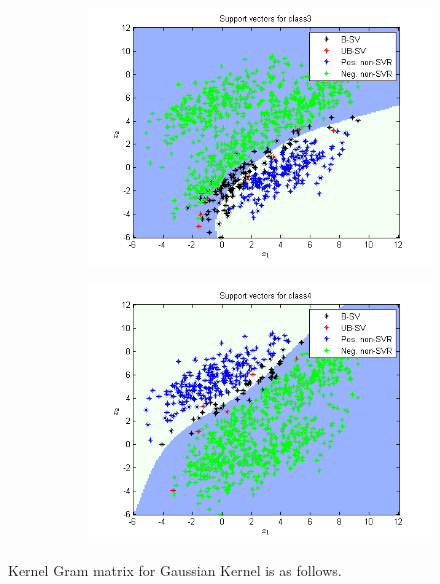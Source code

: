 \documentclass{article}
\begin{document}
\begin{figure}
\begin{subfigure}{.5\textwidth}
  \centering
  \includegraphics[width=.8\linewidth]{Classification/1c/c_g/sv3}
 
\end{subfigure}%
\begin{subfigure}{.5\textwidth}
  \centering
  \includegraphics[width=.8\linewidth]{Classification/1c/c_g/sv4}
  
\end{subfigure}
\end{figure}
\newpage
Kernel Gram matrix for Gaussian Kernel is as follows.
\end{document}
